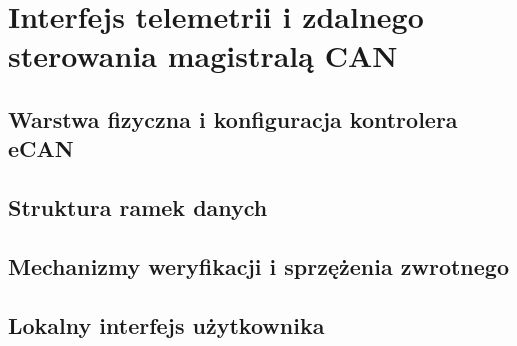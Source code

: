 \chapter{Interfejs telemetrii i zdalnego sterowania magistralą CAN}
\label{chap:telemetria}

\section{Warstwa fizyczna i konfiguracja kontrolera eCAN}

\section{Struktura ramek danych}

\section{Mechanizmy weryfikacji i sprzężenia zwrotnego}

\section{Lokalny interfejs użytkownika}
